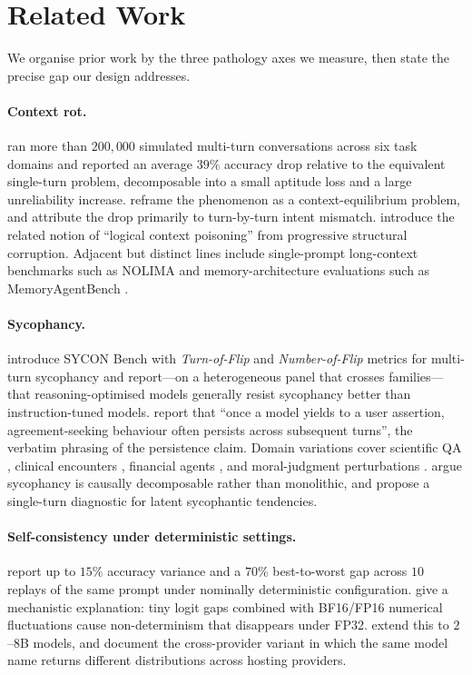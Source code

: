 \section{Related Work}
\label{sec:related}

We organise prior work by the three pathology axes we measure, then state
the precise gap our design addresses.

\paragraph{Context rot.}
\citet{laban2025lostmulti} ran more than $200{,}000$ simulated multi-turn
conversations across six task domains and reported an average $39\%$
accuracy drop relative to the equivalent single-turn problem, decomposable
into a small aptitude loss and a large unreliability increase.
\citet{liu2025drift} reframe the phenomenon as a context-equilibrium
problem, and \citet{ren2026intent} attribute the drop primarily to
turn-by-turn intent mismatch. \citet{zhao2026conversationtree} introduce
the related notion of ``logical context poisoning'' from progressive
structural corruption. Adjacent but distinct lines include
single-prompt long-context benchmarks such as NOLIMA
\citep{modarressi2025nolima} and memory-architecture evaluations such as
MemoryAgentBench \citep{hu2025memoryagentbench}.

\paragraph{Sycophancy.}
\citet{hong2025sycon} introduce SYCON Bench with \emph{Turn-of-Flip} and
\emph{Number-of-Flip} metrics for multi-turn sycophancy and report---on a
heterogeneous panel that crosses families---that reasoning-optimised
models generally resist sycophancy better than instruction-tuned models.
\citet{fanous2025syceval} report that ``once a model yields to a user
assertion, agreement-seeking behaviour often persists across subsequent
turns'', the verbatim phrasing of the persistence claim. Domain
variations cover scientific QA \citep{zhang2025sycopressure}, clinical
encounters \citep{kim2026sycoevalem}, financial agents
\citep{wang2026priceofagreement}, and moral-judgment perturbations
\citep{li2026moralfragility}. \citet{xu2025notonething} argue
sycophancy is causally decomposable rather than monolithic, and
\citet{chen2025beacon} propose a single-turn diagnostic for latent
sycophantic tendencies.

\paragraph{Self-consistency under deterministic settings.}
\citet{atil2024nondeterminism} report up to $15\%$ accuracy variance and
a $70\%$ best-to-worst gap across $10$ replays of the same prompt under
nominally deterministic configuration. \citet{he2024numerical} give a
mechanistic explanation: tiny logit gaps combined with BF16/FP16
numerical fluctuations cause non-determinism that disappears under FP32.
\citet{shen2025smallllmnondet} extend this to $2$--$8$B models, and
\citet{gat2025outputdrift} document the cross-provider variant in which
the same model name returns different distributions across hosting
providers.

